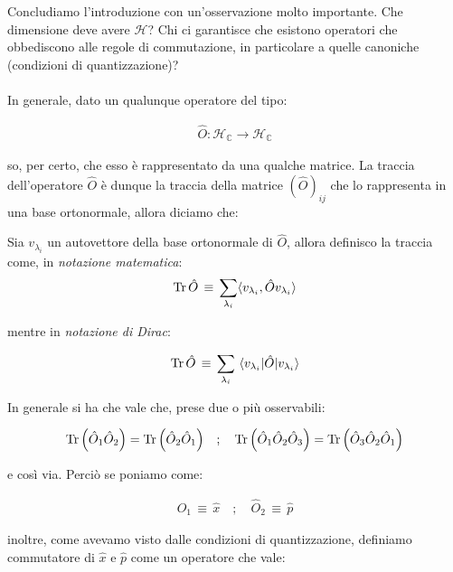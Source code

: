 	Concludiamo l'introduzione con un'osservazione molto importante. Che dimensione deve avere $\mathcal{H}$? Chi ci garantisce che esistono operatori che obbediscono alle regole di commutazione, in particolare a quelle canoniche (condizioni di quantizzazione)?
	\\
	\\
	In generale, dato un qualunque operatore del tipo:
	
\begin{align*}
	\hat{O} : \mathcal{H}_{\mathbb{C}} \to \mathcal{H}_{\mathbb{C}}
\end{align*}
	
	so, per certo, che esso è rappresentato da una qualche matrice. La traccia dell'operatore $\hat{O}$ è dunque la traccia della matrice $(\hat{O})_{ij}$ che lo rappresenta in una base ortonormale, allora diciamo che:

\begin{mydef}
	Sia $v_{\lambda_i}$ un autovettore della base ortonormale di $\hat{O}$, allora definisco la traccia come, in \textit{notazione matematica}:
\begin{align*}
	\Tr \hat{O} \, \equiv \,  \sum_{\lambda_i}\langle v_{\lambda_i}, \hat{O} v_{\lambda_i} \rangle
\end{align*}

	mentre in \textit{notazione di Dirac}:
	
\begin{align*}
	\Tr \hat{O} \, \equiv \, \sum_{\lambda_i}\mel{v_{\lambda_i}}{\hat{O}}{ v_{\lambda_i}}
\end{align*}
\end{mydef}

	In generale si ha che vale che, prese due o più osservabili:
	
\begin{align*}
	\Tr\qty(\hat{O}_1 \hat{O}_2) = \Tr\qty(\hat{O}_2\hat{O}_1) \quad ; \quad \Tr\qty(\hat{O}_1 \hat{O}_2 \hat{O}_3) = \Tr\qty( \hat{O}_3 \hat{O}_2\hat{O}_1)
\end{align*}

	e così via. Perciò se poniamo come:
	
\begin{align*}
	\hat{O}_1 \, \equiv \, \hat{x} \quad ; \quad \hat{O}_2 \, \equiv \, \hat{p}
\end{align*}

	inoltre, come avevamo visto dalle condizioni di quantizzazione, definiamo commutatore di $\hat{x}$ e $\hat{p}$ come un operatore che vale:
	
